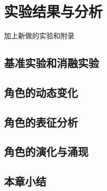 
\chapter{实验结果与分析}
加上新做的实验和附录

\section{基准实验和消融实验}

\section{角色的动态变化}

\section{角色的表征分析}

\section{角色的演化与涌现}

\section{本章小结}

